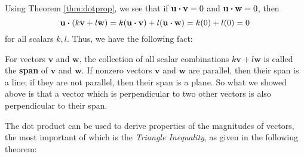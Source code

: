Using Theorem \ref{thm:dotprop}, we see that if $\mathbf{u} \bm{\cdot} \mathbf{v} = 0$ and
$\mathbf{u} \bm{\cdot} \mathbf{w} = 0$, then 
\[\mathbf{u} \bm{\cdot} (k\mathbf{v} + l\mathbf{w}) =
k(\mathbf{u} \bm{\cdot} \mathbf{v}) + l(\mathbf{u} \bm{\cdot} \mathbf{w}) = k(0) + l(0) =0\] for all scalars $k, l$.
Thus, we have the following fact:\smallskip
{}

\smallskip
For vectors $\mathbf{v}$ and $\mathbf{w}$, the collection of all scalar combinations $k\mathbf{v} + l\mathbf{w}$
is called the \textbf{span} of $\mathbf{v}$ and $\mathbf{w}$. 
If nonzero vectors $\mathbf{v}$ and $\mathbf{w}$ are
parallel, then their span is a line; if they are not parallel, then their span is a plane. So what we showed above is
that a vector which is perpendicular to two other vectors is also perpendicular to their span.

The dot product can be used to derive properties of the magnitudes of vectors, the most important of which is the
\emph{Triangle Inequality}, as given in the following theorem:

